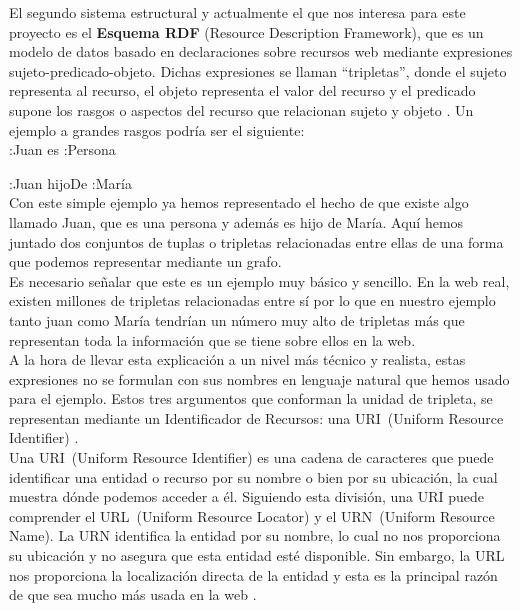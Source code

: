 El segundo sistema estructural y actualmente el que nos interesa para este proyecto es el \textbf{Esquema RDF} (Resource Description Framework), que es un modelo de datos basado en declaraciones sobre recursos web mediante expresiones sujeto-predicado-objeto. Dichas expresiones se llaman ``tripletas'', donde el sujeto representa al recurso, el objeto representa el valor del recurso y el predicado supone los rasgos o aspectos del recurso que relacionan sujeto y objeto \cite{sakr2018}. Un ejemplo a grandes rasgos podría ser el siguiente:\\

:Juan es :Persona

:Juan hijoDe :María\\

Con este simple ejemplo ya hemos representado el hecho de que existe algo llamado Juan, que es una persona y además es hijo de María. Aquí hemos juntado dos conjuntos de tuplas o tripletas relacionadas entre ellas de una forma que podemos representar mediante un grafo.\\

Es necesario señalar que este es un ejemplo muy básico y sencillo. En la web real, existen millones de tripletas relacionadas entre sí por lo que en nuestro ejemplo tanto juan como María tendrían un número muy alto de tripletas más que representan toda la información que se tiene sobre ellos en la web.\\

A la hora de llevar esta explicación a un nivel más técnico y realista, estas expresiones no se formulan con sus nombres en lenguaje natural que hemos usado para el ejemplo. Estos tres argumentos que conforman la unidad de tripleta, se representan mediante un Identificador de Recursos: una URI~(Uniform Resource Identifier) \cite{sakr2018,berners2007}.\\

Una URI~(Uniform Resource Identifier) es una cadena de caracteres que puede identificar una entidad o recurso por su nombre o bien por su ubicación, la cual muestra dónde podemos acceder a él. Siguiendo esta división, una URI puede comprender el URL~(Uniform Resource Locator) y el URN~(Uniform Resource Name). La URN identifica la entidad por su nombre, lo cual no nos proporciona su ubicación y no asegura que esta entidad esté disponible. Sin embargo, la URL nos proporciona la localización directa de la entidad y esta es la principal razón de que sea mucho más usada en la web \cite{berners1994,saint2017,sakr2018}.\\

